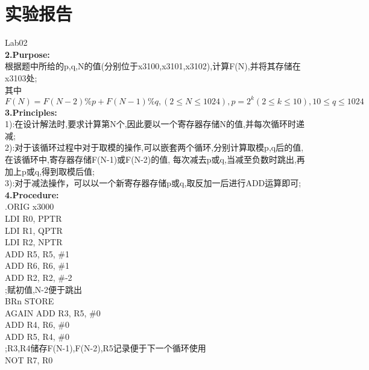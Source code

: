 \documentclass[12pt]{ctexart}
\begin{document}
\section*{实验报告}
Lab02\\
{\bf2.Purpose:}\\
根据题中所给的p,q,N的值(分别位于x3100,x3101,x3102),计算F(N),并将其存储在x3103处;\\
其中$F(N)=F(N-2)\%p+F(N-1)\%q,(2\le N\le 1024),p=2^{k} (2\le k\le 10),10\le q\le 1024$\\
{\bf3.Principles:}\\
1):在设计解法时,要求计算第N个,因此要以一个寄存器存储N的值,并每次循环时递减;\\
2):对于该循环过程中对于取模的操作,可以嵌套两个循环,分别计算取模p,q后的值,在该循环中,寄存器存储F(N-1)或F(N-2)的值,
每次减去p或q,当减至负数时跳出,再加上p或q,得到取模后值;\\
3):对于减法操作，可以以一个新寄存器存储p或q,取反加一后进行ADD运算即可;\\
{\bf4.Procedure:}\\
\hspace*{1.5cm}.ORIG x3000\\
\hspace*{1.5cm}LDI  R0, PPTR\\
\hspace*{1.5cm}LDI  R1, QPTR\\
\hspace*{1.5cm}LDI  R2, NPTR\\
\hspace*{1.5cm}ADD R5, R5, \#1\\
\hspace*{1.5cm}ADD R6, R6, \#1\\
\hspace*{1.5cm}ADD R2, R2, \#-2\\
\hspace*{1.5cm};赋初值,N-2便于跳出\\
\hspace*{1.5cm}BRn STORE\\
AGAIN   ADD R3, R5, \#0\\
\hspace*{1.5cm}ADD R4, R6, \#0\\
\hspace*{1.5cm}ADD R5, R4, \#0\\
\hspace*{1.5cm};R3,R4储存F(N-1),F(N-2),R5记录便于下一个循环使用\\
\hspace*{1.5cm}NOT R7, R0\\
\end{document}

